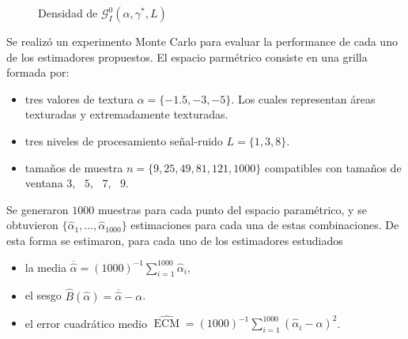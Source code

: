 \begin{figure}[H]
	\centering
	\caption{\label{densidades}\small Densidad de $\mathcal{G}_I^0(\alpha,\gamma^*,L)$}
\end{figure}


Se realizó un experimento Monte Carlo para evaluar la performance de cada uno de los estimadores propuestos. El espacio parmétrico consiste en una grilla formada por:
\begin{itemize}
	\item tres valores de textura $\alpha=\{-1.5,-3,-5\}$. Los cuales representan áreas texturadas y extremadamente texturadas.
	\item tres niveles de procesamiento señal-ruido $L=\{1,3,8\}$.
	\item tamaños de muestra $n=\{9,25,49,81,121,1000\}$ compatibles con tamaños de ventana $3,\text{ }5,\text{ }7,\text{ }9$.
\end{itemize}

Se generaron $1000$ muestras para cada punto del espacio paramétrico, y se obtuvieron $\{\widehat{\alpha}_1, \dots, \widehat{\alpha}_{1000}\}$ estimaciones para cada una de estas combinaciones. De esta forma se estimaron, para cada uno de los estimadores estudiados
\begin{itemize}
	\label{ExperimentoMontecarlo}
	\item la media $\overline{\widehat{\alpha}}=(1000)^{-1}{\sum_{i=1}^{1000}{\widehat{\alpha}_i}}$,
	\item el sesgo  $\widehat{B}(\widehat\alpha) = \overline{\widehat\alpha}- \alpha$.
	 \item el error cuadrático medio $\widehat{\operatorname{ECM}}=({1000})^{-1}{\sum_{i=1}^{1000}{(\widehat{\alpha}_i-\alpha)^2}}$.
\end{itemize}
  
